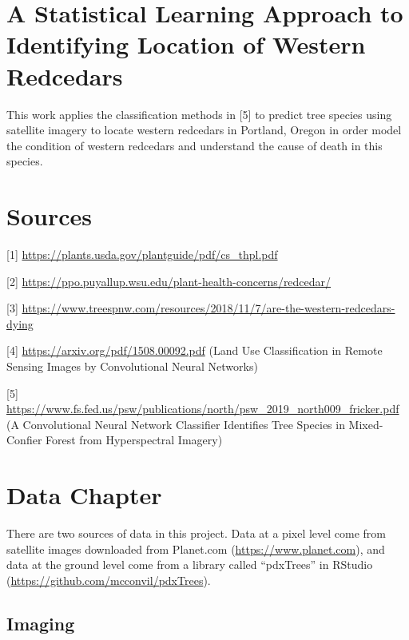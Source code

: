 \documentclass[12pt,twoside]{reedthesis}
\begin{document}
\hypertarget{a-statistical-learning-approach-to-identifying-location-of-western-redcedars}{%
\section{A Statistical Learning Approach to Identifying Location of Western Redcedars}\label{a-statistical-learning-approach-to-identifying-location-of-western-redcedars}}

This work applies the classification methods in {[}5{]} to predict tree species using satellite imagery to locate western redcedars in Portland, Oregon in order model the condition of western redcedars and understand the cause of death in this species.

\hypertarget{sources}{%
\section{Sources}\label{sources}}

{[}1{]} \url{https://plants.usda.gov/plantguide/pdf/cs_thpl.pdf}

{[}2{]} \url{https://ppo.puyallup.wsu.edu/plant-health-concerns/redcedar/}

{[}3{]} \url{https://www.treespnw.com/resources/2018/11/7/are-the-western-redcedars-dying}

{[}4{]} \url{https://arxiv.org/pdf/1508.00092.pdf} (Land Use Classification in Remote Sensing Images by Convolutional Neural Networks)

{[}5{]} \url{https://www.fs.fed.us/psw/publications/north/psw_2019_north009_fricker.pdf} (A Convolutional Neural Network Classifier Identifies Tree Species in Mixed-Confier Forest from Hyperspectral Imagery)

\hypertarget{data-chapter}{%
\section{Data Chapter}\label{data-chapter}}

There are two sources of data in this project. Data at a pixel level come from satellite images downloaded from Planet.com (\url{https://www.planet.com}), and data at the ground level come from a library called ``pdxTrees'' in RStudio (\url{https://github.com/mcconvil/pdxTrees}).

\hypertarget{imaging}{%
\subsection{Imaging}\label{imaging}}
\end{document}
